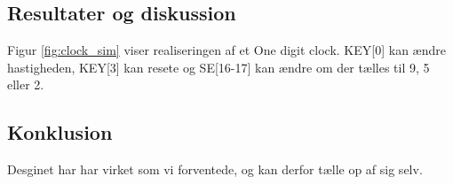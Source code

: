 \documentclass[../journal.tex]{subfiles}
\begin{document}
\subsection{Resultater og diskussion}

Figur \ref{fig:clock_sim} viser realiseringen af et One digit clock. KEY[0] kan ændre hastigheden, KEY[3] kan resete og SE[16-17] kan ændre om der tælles til 9, 5 eller 2.


\subsection{Konklusion}

Desginet har har virket som vi forventede, og kan derfor tælle op af sig selv. 
\end{document}
